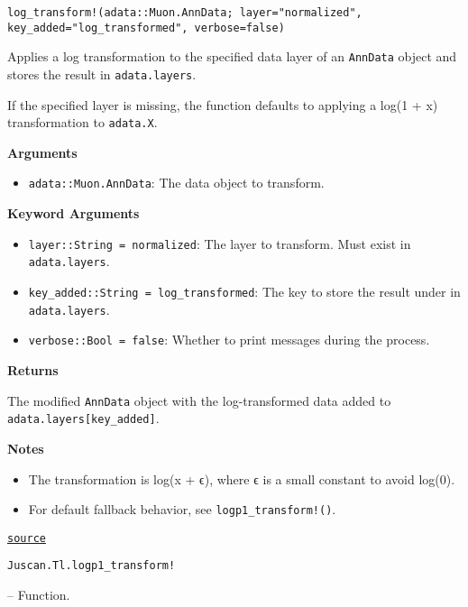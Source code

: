 \documentclass[oneside]{memoir}
\begin{document}
\begin{adjustwidth}{2em}{0pt}


\begin{verbatim}
log_transform!(adata::Muon.AnnData; layer="normalized", key_added="log_transformed", verbose=false)
\end{verbatim}

Applies a log transformation to the specified data layer of an \texttt{AnnData} object and stores the result in \texttt{adata.layers}.

If the specified layer is missing, the function defaults to applying a log(1 + x) transformation to \texttt{adata.X}.

\textbf{Arguments}

\begin{itemize}
\item \texttt{adata::Muon.AnnData}: The data object to transform.

\end{itemize}
\textbf{Keyword Arguments}

\begin{itemize}
\item \texttt{layer::String = {\textquotedbl}normalized{\textquotedbl}}: The layer to transform. Must exist in \texttt{adata.layers}.


\item \texttt{key\_added::String = {\textquotedbl}log\_transformed{\textquotedbl}}: The key to store the result under in \texttt{adata.layers}.


\item \texttt{verbose::Bool = false}: Whether to print messages during the process.

\end{itemize}
\textbf{Returns}

The modified \texttt{AnnData} object with the log-transformed data added to \texttt{adata.layers[key\_added]}.

\textbf{Notes}

\begin{itemize}
\item The transformation is log(x + ϵ), where ϵ is a small constant to avoid log(0).


\item For default fallback behavior, see \texttt{logp1\_transform!()}.

\end{itemize}


\href{https://github.com/zehua0417/Juscan.jl/blob/393ad1b827b678ea98a738f92af658ee9ed9a403/src/tools/pca.jl#L187-L209}{\texttt{source}}


\end{adjustwidth}
\hypertarget{11479438080404143993}{\texttt{Juscan.Tl.logp1\_transform!}}  -- {Function.}
\end{document}
